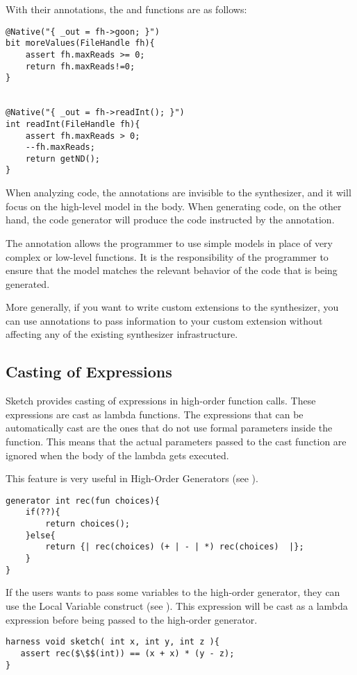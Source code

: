 \begin{Example}
With their annotations, the  and  functions are as follows:
\begin{lstlisting}
@Native("{ _out = fh->goon; }")
bit moreValues(FileHandle fh){
    assert fh.maxReads >= 0;
    return fh.maxReads!=0;
}


@Native("{ _out = fh->readInt(); }")
int readInt(FileHandle fh){
    assert fh.maxReads > 0;
    --fh.maxReads;
    return getND();
}
\end{lstlisting}

When analyzing code, the annotations are invisible to the synthesizer, and it will focus on the high-level model in the body. When generating code, on the other hand, the code generator will produce the code instructed by the  annotation.

\end{Example}

The  annotation allows the programmer to use simple models in place of very complex or low-level functions. It is the responsibility of the programmer to ensure that the model matches the relevant behavior of the code that is being generated.

More generally, if you want to write custom extensions to the \Sk{} synthesizer, you can use annotations to pass information to your custom extension without affecting any of the existing synthesizer infrastructure.

\subsection{Casting of Expressions}
Sketch provides casting of expressions in high-order function calls. These expressions are cast as lambda functions. The expressions that can be automatically cast are the ones that do not use formal parameters inside the function. This means that the actual parameters passed to the cast function are ignored when the body of the lambda gets executed.

This feature is very useful in High-Order Generators (see ).
\begin{lstlisting}
generator int rec(fun choices){
    if(??){
        return choices();
    }else{
        return {| rec(choices) (+ | - | *) rec(choices)  |};
    }
}
\end{lstlisting}

If the users wants to pass some variables to the high-order generator, they can use the Local Variable construct (see ). This expression will be cast as a lambda expression before being passed to the high-order generator.
\begin{lstlisting}
harness void sketch( int x, int y, int z ){
   assert rec($\$$(int)) == (x + x) * (y - z);
}
\end{lstlisting}
